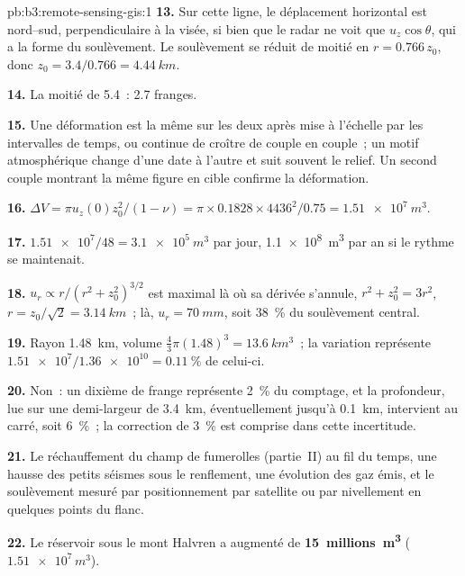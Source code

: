 \begin{solution}{pb:b3:remote-sensing-gis:1}
\textbf{13.} Sur cette ligne, le déplacement horizontal est nord--sud,
perpendiculaire à la visée, si bien que le radar ne voit que $u_z\cos\theta$, qui a
la forme du soulèvement. Le soulèvement se réduit de moitié en $r = 0.766\,z_0$, donc $z_0 =
3.4/0.766 = \qty{4.44}{km}$.

\textbf{14.} La moitié de 5.4~: 2.7 franges.

\textbf{15.} Une déformation est la même sur les deux  après
mise à l'échelle par les intervalles de temps, ou continue de croître de couple
en couple~; un motif atmosphérique change d'une date à l'autre et suit souvent
le relief. Un second couple montrant la même figure en cible confirme la
déformation.

\textbf{16.} $\Delta V = \pi u_z(0)z_0^2/(1 - \nu) = \pi\times0.1828\times
4436^2/0.75 = \qty{1.51e7}{m^3}$.

\textbf{17.} $\num{1.51e7}/48 = \qty{3.1e5}{m^3}$ par jour, \qty{1.1e8}{m^3}
par an si le rythme se maintenait.

\textbf{18.} $u_r \propto r/(r^2 + z_0^2)^{3/2}$ est maximal là où sa
dérivée s'annule, $r^2 + z_0^2 = 3r^2$, $r = z_0/\sqrt2 = \qty{3.14}{km}$~;
là, $u_r = \qty{70}{mm}$, soit \qty{38}{\percent} du soulèvement central.

\textbf{19.} Rayon \qty{1.48}{km}, volume $\frac43\pi(1.48)^3 =
\qty{13.6}{km^3}$~; la variation représente $\num{1.51e7}/\num{1.36e10} =
\qty{0.11}{\percent}$ de celui-ci.

\textbf{20.} Non~: un dixième de frange représente \qty{2}{\percent} du comptage, et
la profondeur, lue sur une demi-largeur de \qty{3.4}{km}, éventuellement jusqu'à
\qty{0.1}{km}, intervient au carré, soit \qty{6}{\percent}~; la correction de \qty{3}{\percent}
est comprise dans cette incertitude.

\textbf{21.} Le réchauffement du champ de fumerolles (partie~II) au fil du temps,
une hausse des petits séismes sous le renflement, une évolution des gaz
émis, et le soulèvement mesuré par positionnement par satellite ou par nivellement en
quelques points du flanc.

\textbf{22.} Le réservoir sous le mont Halvren a augmenté de
\textbf{15~millions~\unit[text-series-to-math=true]{m^3}} ($\num{1.51e7}\,\unit{m^3}$).
\end{solution}
